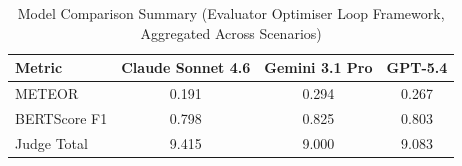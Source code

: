 \begin{table}[htbp]
\centering
\caption{Model Comparison Summary (Evaluator Optimiser Loop Framework, Aggregated Across Scenarios)}
\label{tab:model_summary}
\begin{tabular}{lccc}
\toprule
Metric & Claude Sonnet 4.6 & Gemini 3.1 Pro & GPT-5.4 \\
\midrule
METEOR & 0.191 & 0.294 & 0.267 \\
BERTScore F1 & 0.798 & 0.825 & 0.803 \\
Judge Total & 9.415 & 9.000 & 9.083 \\
\bottomrule
\end{tabular}
\end{table}